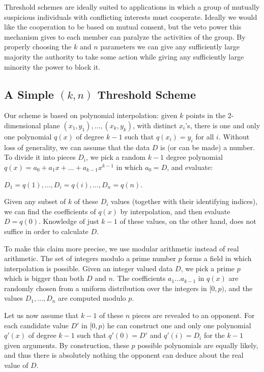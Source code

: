 Threshold schemes are ideally suited to applications in which a group of
mutually suspicious individuals with conflicting interests must cooperate.
Ideally we would like the cooperation to be based on mutual consent,
but the veto power this mechanism gives to each member can paralyze the
activities of the group. By properly choosing the $k$ and $n$ parameters
we can give any sufficiently large majority the authority to take some
action while giving any sufficiently large minority the power to block it.

\subsection{A Simple \texorpdfstring{$(k, n)$}{(k, n)} Threshold Scheme}
Our scheme is based on polynomial interpolation: given $k$ points in the
2-dimensional plane $(x_1, y_1), \ldots, (x_k, y_k)$, with distinct $x_i$'s,
there is one and only one polynomial $q(x)$ of degree $k - 1$ such
that $q(x_i) = y_i$ for all $i$. Without loss of generality, we can
assume that the data $D$ is (or can be made) a number. To divide it into
pieces $D_i$, we pick a random $k - 1$ degree polynomial
$q(x) = a_0 + a_1x + \ldots + a_{k-1}x^{k-1}$ in which $a_0 = D$, and evaluate:

$D_1 = q(1), \ldots, D_i = q(i), \ldots, D_n = q(n)$.

Given any subset of $k$ of these $D_i$ values (together with their identifying indices),
we can find the coefficients of $q(x)$ by interpolation, and then evaluate
$D = q(0)$. Knowledge of just $k - 1$ of these values, on the other hand,
does not suffice in order to calculate $D$.

To make this claim more precise, we use modular arithmetic instead of real
arithmetic. The set of integers modulo a prime number $p$ forms a field in
which interpolation is possible. Given an integer valued data $D$, we pick
a prime $p$ which is bigger than both $D$ and $n$.
The coefficients $a_1 \ldots a_{k-1}$ in $q(x)$ are randomly chosen from a
uniform distribution over the integers in $[0, p)$, and the values $D_1, \ldots, D_n$ are computed modulo $p$.

Let us now assume that $k - 1$ of these $n$ pieces are revealed to an opponent.
For each candidate value $D'$ in $[0, p)$ he can construct one and only one
polynomial $q'(x)$ of degree $k - 1$ such that $q'(0) = D'$ and $q'(i) = D_i$ for
the $k - 1$ given arguments. By construction, these $p$ possible polynomials
are equally likely, and thus there is absolutely nothing the opponent can deduce
about the real value of $D$.

